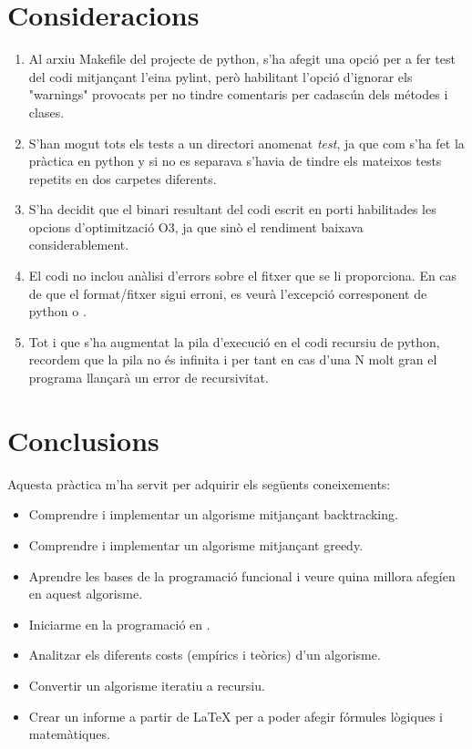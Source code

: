 \documentclass[12pt, letterpaper]{article}
\begin{document}
\section{Consideracions}
\begin{enumerate}
\item Al arxiu Makefile del projecte de python, s'ha afegit una opció per a fer test del codi mitjançant l'eina pylint, però habilitant l'opció d'ignorar els "warnings" provocats per no tindre
    comentaris per cadascún dels métodes i clases.
\item S'han mogut tots els tests a un directori anomenat \textit{test}, ja que com s'ha fet la pràctica en python y \cpluspluslogo si no es separava s'havia de tindre els mateixos tests repetits en dos carpetes diferents.
\item S'ha decidit que el binari resultant del codi escrit en \cpluspluslogo porti habilitades les opcions d'optimització O3, ja que sinò el rendiment baixava considerablement.
\item El codi no inclou anàlisi d'errors sobre el fitxer que se li proporciona. En cas de que el format/fitxer sigui erroni, es veurà l'excepció corresponent 
    de python o \cpluspluslogo.
\item Tot i que s'ha augmentat la pila d'execució en el codi recursiu de python, recordem que la pila no és infinita i per tant en cas d'una N molt gran el programa llançarà un error de recursivitat.
\end{enumerate}

\section{Conclusions}
Aquesta pràctica m'ha servit per adquirir els següents coneixements:
\begin{itemize}
    \item Comprendre i implementar un algorisme mitjançant backtracking.
    \item Comprendre i implementar un algorisme mitjançant greedy.
    \item Aprendre les bases de la programació funcional i veure quina millora afegíen en aquest algorisme.
    \item Iniciarme en la programació en \cpluspluslogo.
    \item Analitzar els diferents costs (empírics i teòrics) d'un algorisme.
    \item Convertir un algorisme iteratiu a recursiu.
    \item Crear un informe a partir de {\LaTeX} per a poder afegir fórmules lògiques i matemàtiques.
\end{itemize}
\end{document}
